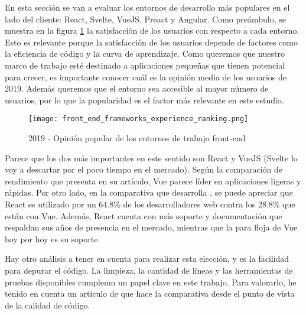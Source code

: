 En esta sección se van a evaluar los entornos de desarrollo más populares en el lado del cliente: React, Svelte, VueJS, Preact y Angular. Como preámbulo, se muestra en la figura \cref{fig:stjs2019:frontend} la satisfacción de los usuarios con respecto a cada entorno. Esto es relevante porque la satisfacción de los usuarios depende de factores como la eficiencia de código y la curva de aprendizaje. Como queremos que nuestro marco de trabajo esté destinado a aplicaciones pequeñas que tienen potencial para crecer, es importante conocer cuál es la opinión media de los usuarios de 2019. Además queremos que el entorno sea accesible al mayor número de usuarios, por lo que la popularidad es el factor más relevante en este estudio.

\begin{figure}
	\centering
	\texttt{[image: front\_end\_frameworks\_experience\_ranking.png]}
	\caption{2019 - Opinión popular de los entornos de trabajo front-end}
	\label{fig:stjs2019:frontend}
\end{figure}

Parece que los dos más importantes en este sentido son React y VueJS (Svelte lo voy a descartar por el poco tiempo en el mercado). Según la comparación de rendimiento que presenta \citet{RWC2019} en su artículo, Vue parece líder en aplicaciones ligeras y rápidas. Por otro lado, en la comparativa que desarrolla \citet{TJSF2019}, se puede apreciar que React es utilizado por un 64.8\% de los desarrolladores web contra los 28.8\% que están con Vue. Además, React cuenta con más soporte y documentación que respaldan sus años de presencia en el mercado, mientras que la para floja de Vue hoy por hoy es su soporte.

Hay otro análisis a tener en cuenta para realizar esta elección, y es la facilidad para depurar el código. La limpieza, la cantidad de líneas y las herramientas de pruebas disponibles cumplemn un papel clave en este trabajo. Para valorarlo, he tenido en cuenta un artículo de \citet{RVVCTOG} que hace la comparativa desde el punto de vista de la calidad de código.

